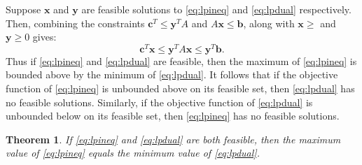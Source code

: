 \documentclass{amsbook}
\newcommand{\xx}{\mathbf x}
\newcommand{\yy}{\mathbf y}
\newcommand{\cc}{\mathbf c}
\newcommand{\bb}{\mathbf b}
\newtheorem{theorem}{Theorem}[section]
\theoremstyle{definition}
\theoremstyle{remark}
\begin{document}
Suppose $\xx$ and $\yy$ are feasible solutions to \eqref{eq:lpineq} and \eqref{eq:lpdual} respectively.
Then, combining the constraints $\cc^T\leq \yy^TA$ and $A\xx\leq \bb$, along with $\xx\geq$ and $\yy\geq 0$ gives:
\begin{displaymath}
  \cc^T\xx\leq\yy^TA\xx\leq \yy^T\bb.
\end{displaymath}
Thus if \eqref{eq:lpineq} and \eqref{eq:lpdual} are feasible, then the maximum of \eqref{eq:lpineq} is bounded above by the minimum of \eqref{eq:lpdual}.
It follows that if the objective function of \eqref{eq:lpineq} is unbounded above on its feasible set, then \eqref{eq:lpdual} has no feasible solutions.
Similarly, if the objective function of \eqref{eq:lpdual} is unbounded below on its feasible set, then \eqref{eq:lpineq} has no feasible solutions.
\begin{theorem}
  \label{theorem:duality}
  If \eqref{eq:lpineq} and \eqref{eq:lpdual} are both feasible, then the maximum value of \eqref{eq:lpineq} equals the minimum value of \eqref{eq:lpdual}.
\end{theorem}
\end{document}
